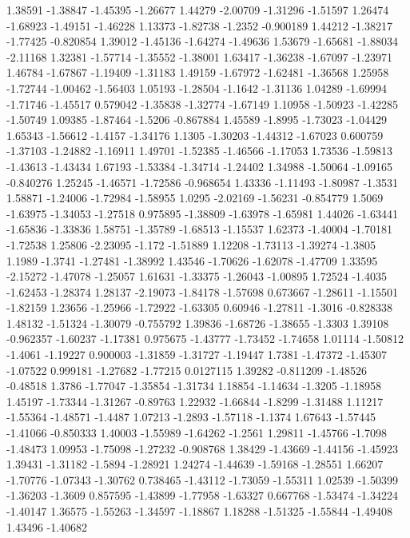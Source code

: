 \documentclass[9pt]{article}
\theoremstyle{plain}
\theoremstyle{definition}
\theoremstyle{remark}
\numberwithin{equation}{section}
\begin{document}
1.38591
-1.38847
-1.45395
-1.26677
1.44279
-2.00709
-1.31296
-1.51597
1.26474
-1.68923
-1.49151
-1.46228
1.13373
-1.82738
-1.2352
-0.900189
1.44212
-1.38217
-1.77425
-0.820854
1.39012
-1.45136
-1.64274
-1.49636
1.53679
-1.65681
-1.88034
-2.11168
1.32381
-1.57714
-1.35552
-1.38001
1.63417
-1.36238
-1.67097
-1.23971
1.46784
-1.67867
-1.19409
-1.31183
1.49159
-1.67972
-1.62481
-1.36568
1.25958
-1.72744
-1.00462
-1.56403
1.05193
-1.28504
-1.1642
-1.31136
1.04289
-1.69994
-1.71746
-1.45517
0.579042
-1.35838
-1.32774
-1.67149
1.10958
-1.50923
-1.42285
-1.50749
1.09385
-1.87464
-1.5206
-0.867884
1.45589
-1.8995
-1.73023
-1.04429
1.65343
-1.56612
-1.4157
-1.34176
1.1305
-1.30203
-1.44312
-1.67023
0.600759
-1.37103
-1.24882
-1.16911
1.49701
-1.52385
-1.46566
-1.17053
1.73536
-1.59813
-1.43613
-1.43434
1.67193
-1.53384
-1.34714
-1.24402
1.34988
-1.50064
-1.09165
-0.840276
1.25245
-1.46571
-1.72586
-0.968654
1.43336
-1.11493
-1.80987
-1.3531
1.58871
-1.24006
-1.72984
-1.58955
1.0295
-2.02169
-1.56231
-0.854779
1.5069
-1.63975
-1.34053
-1.27518
0.975895
-1.38809
-1.63978
-1.65981
1.44026
-1.63441
-1.65836
-1.33836
1.58751
-1.35789
-1.68513
-1.15537
1.62373
-1.40004
-1.70181
-1.72538
1.25806
-2.23095
-1.172
-1.51889
1.12208
-1.73113
-1.39274
-1.3805
1.1989
-1.3741
-1.27481
-1.38992
1.43546
-1.70626
-1.62078
-1.47709
1.33595
-2.15272
-1.47078
-1.25057
1.61631
-1.33375
-1.26043
-1.00895
1.72524
-1.4035
-1.62453
-1.28374
1.28137
-2.19073
-1.84178
-1.57698
0.673667
-1.28611
-1.15501
-1.82159
1.23656
-1.25966
-1.72922
-1.63305
0.60946
-1.27811
-1.3016
-0.828338
1.48132
-1.51324
-1.30079
-0.755792
1.39836
-1.68726
-1.38655
-1.3303
1.39108
-0.962357
-1.60237
-1.17381
0.975675
-1.43777
-1.73452
-1.74658
1.01114
-1.50812
-1.4061
-1.19227
0.900003
-1.31859
-1.31727
-1.19447
1.7381
-1.47372
-1.45307
-1.07522
0.999181
-1.27682
-1.77215
0.0127115
1.39282
-0.811209
-1.48526
-0.48518
1.3786
-1.77047
-1.35854
-1.31734
1.18854
-1.14634
-1.3205
-1.18958
1.45197
-1.73344
-1.31267
-0.89763
1.22932
-1.66844
-1.8299
-1.31488
1.11217
-1.55364
-1.48571
-1.4487
1.07213
-1.2893
-1.57118
-1.1374
1.67643
-1.57445
-1.41066
-0.850333
1.40003
-1.55989
-1.64262
-1.2561
1.29811
-1.45766
-1.7098
-1.48473
1.09953
-1.75098
-1.27232
-0.908768
1.38429
-1.43669
-1.44156
-1.45923
1.39431
-1.31182
-1.5894
-1.28921
1.24274
-1.44639
-1.59168
-1.28551
1.66207
-1.70776
-1.07343
-1.30762
0.738465
-1.43112
-1.73059
-1.55311
1.02539
-1.50399
-1.36203
-1.3609
0.857595
-1.43899
-1.77958
-1.63327
0.667768
-1.53474
-1.34224
-1.40147
1.36575
-1.55263
-1.34597
-1.18867
1.18288
-1.51325
-1.55844
-1.49408
1.43496
-1.40682
\end{document}
